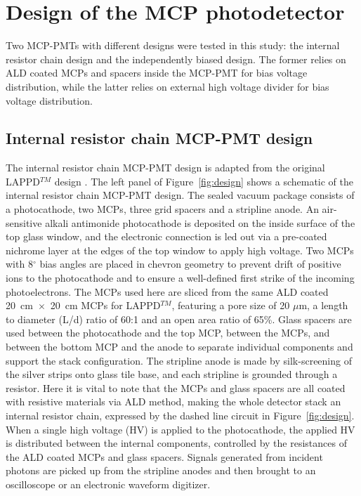 \documentclass[preprint,5p]{elsarticle}
\begin{document}
\section{Design of the MCP photodetector} \label{sec_design}
Two MCP-PMTs with different designs were tested in this study: the internal 
resistor chain design and the independently biased design. The former relies on 
ALD coated MCPs and spacers inside the MCP-PMT for bias voltage distribution, 
while the latter relies on external high voltage divider for bias voltage 
distribution.  

\subsection{Internal resistor chain MCP-PMT design} \label{}
The internal resistor chain MCP-PMT design is adapted from the original 
LAPPD$^{TM}$ design \cite{17}. The left panel of Figure~\ref{fig:design} shows 
a schematic of the internal resistor chain MCP-PMT design. The sealed vacuum 
package consists of a photocathode, two MCPs, three grid spacers and a 
stripline anode.  An air-sensitive alkali antimonide photocathode is deposited 
on the inside surface of the top glass window, and the electronic connection is 
led out via a pre-coated nichrome layer at the edges of the top window to apply 
high voltage.  Two MCPs with 8$^{\circ}$ bias angles are placed in chevron 
geometry to prevent drift of positive ions to the photocathode and to ensure a 
well-defined first strike of the incoming photoelectrons. The MCPs used here 
are sliced from the same ALD coated 20~cm~$\times$~20~cm MCPs for LAPPD$^{TM}$, 
featuring a pore size of 20 $\mu$m, a length to diameter (L/d) ratio of 60:1 
and an open area ratio of 65\%.  Glass spacers are used between the 
photocathode and the top MCP, between the MCPs, and between the bottom MCP and 
the anode to separate individual components and support the stack 
configuration. The stripline anode is made by silk-screening of the silver 
strips onto glass tile base, and each stripline is grounded through a resistor.  
Here it is vital to note that the MCPs and glass spacers are all coated with 
resistive materials via ALD method, making the whole detector stack an internal 
resistor chain, expressed by the dashed line circuit in 
Figure~\ref{fig:design}. When a single high voltage (HV) is applied to the 
photocathode, the applied HV is distributed between the internal components, 
controlled by the resistances of the ALD coated MCPs and glass spacers. Signals 
generated from incident photons are picked up from the stripline anodes and 
then brought to an oscilloscope or an electronic waveform digitizer. 
\end{document}
